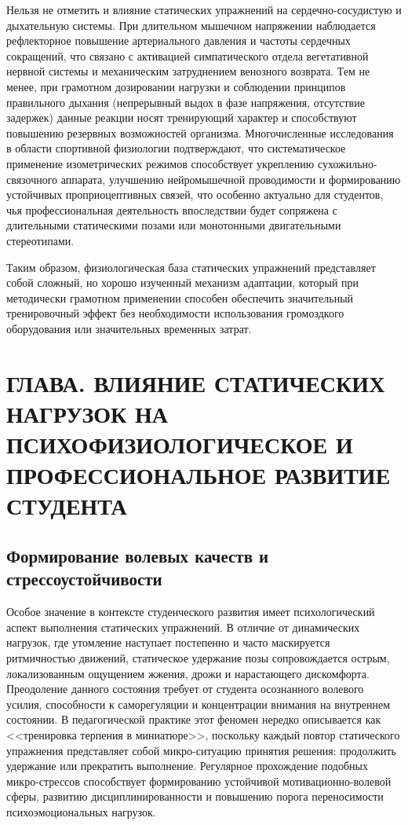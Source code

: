 \documentclass[oneside,a4paper,14pt]{extarticle}
\begin{document}
Нельзя не отметить и влияние статических упражнений на сердечно-сосудистую и дыхательную системы. При длительном мышечном напряжении наблюдается рефлекторное повышение артериального давления и частоты сердечных сокращений, что связано с активацией симпатического отдела вегетативной нервной системы и механическим затруднением венозного возврата. Тем не менее, при грамотном дозировании нагрузки и соблюдении принципов правильного дыхания (непрерывный выдох в фазе напряжения, отсутствие задержек) данные реакции носят тренирующий характер и способствуют повышению резервных возможностей организма. Многочисленные исследования в области спортивной физиологии подтверждают, что систематическое применение изометрических режимов способствует укреплению сухожильно-связочного аппарата, улучшению нейромышечной проводимости и формированию устойчивых проприоцептивных связей, что особенно актуально для студентов, чья профессиональная деятельность впоследствии будет сопряжена с длительными статическими позами или монотонными двигательными стереотипами.

Таким образом, физиологическая база статических упражнений представляет собой сложный, но хорошо изученный механизм адаптации, который при методически грамотном применении способен обеспечить значительный тренировочный эффект без необходимости использования громоздкого оборудования или значительных временных затрат.

\section{ГЛАВА. ВЛИЯНИЕ СТАТИЧЕСКИХ НАГРУЗОК НА ПСИХОФИЗИОЛОГИЧЕСКОЕ И ПРОФЕССИОНАЛЬНОЕ РАЗВИТИЕ СТУДЕНТА}

\subsection{Формирование волевых качеств и стрессоустойчивости}

Особое значение в контексте студенческого развития имеет психологический аспект выполнения статических упражнений. В отличие от динамических нагрузок, где утомление наступает постепенно и часто маскируется ритмичностью движений, статическое удержание позы сопровождается острым, локализованным ощущением жжения, дрожи и нарастающего дискомфорта. Преодоление данного состояния требует от студента осознанного волевого усилия, способности к саморегуляции и концентрации внимания на внутреннем состоянии. В педагогической практике этот феномен нередко описывается как <<тренировка терпения в миниатюре>>, поскольку каждый повтор статического упражнения представляет собой микро-ситуацию принятия решения: продолжить удержание или прекратить выполнение. Регулярное прохождение подобных микро-стрессов способствует формированию устойчивой мотивационно-волевой сферы, развитию дисциплинированности и повышению порога переносимости психоэмоциональных нагрузок.
\end{document}
